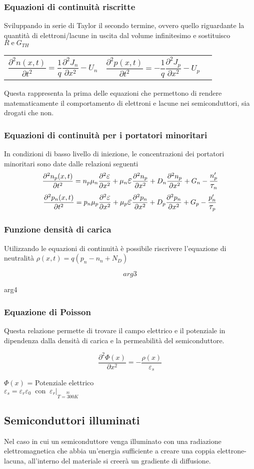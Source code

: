 \documentclass[12pt,a4paper]{article}
\makeatletter
\newcommand{\pdv}[3]{\frac{\partial^{#2} #1}{\partial #3^{#2}}}
\newcommand{\barSi}{\Big\lvert_{ \overset{Si}{T=300K}}}
\newcommand{\Tau}{ \mathlarger{\mathlarger{ \tau }}}
\newcommand{\Beps}{ \mathlarger{\mathlarger{ \varepsilon }}}
\newcommand{\eqlist}[4]{ 
	\subsubsection*{#1}
	\parbox{19cm}{#2}
	
	\begin{equation}
	#3
	\end{equation}
	\noindent\parbox{19cm}{#4}}
\newcommand{\deqlist}[5]{
	\subsubsection*{#1}
	
	\parbox{19cm}{#2}
	
	\noindent\begin{tabularx}{\textwidth}{@{}XXX@{}}
	\begin{equation}
	#3
	\end{equation}  & 
	\begin{equation}
	#4
	\end{equation}
	
	\end{tabularx}
	
	\noindent\parbox{19cm}{#5}}
\makeatother
\begin{document}
		\deqlist{Equazioni di continuità riscritte}
		{Sviluppando in serie di Taylor il secondo termine, ovvero quello riguardante la quantità di elettroni/lacune in uscita dal volume infinitesimo e sostituisco $ R \; \text{e} \; G_{TH}$}
		{\pdv{n(x,t)}{2}{t} = \frac{1}{q} \pdv{J_{n}}{2}{x} - U_{n}}
		{\pdv{p(x,t)}{2}{t} = - \frac{1}{q} \pdv{J_{p}}{2}{x} - U_{p}}
		{Questa rappresenta la prima delle equazioni che permettono di rendere matematicamente il comportamento di elettroni e lacune nei semiconduttori, sia drogati che non.} 
		
		
		\subsubsection*{Equazioni di continuità per i portatori minoritari}
		{In condizioni di basso livello di iniezione, le concentrazioni dei portatori minoritari sono date dalle relazioni seguenti }
		\begin{equation}
		\pdv{n_{p}(x,t)}{2}{t} = n_{p} \mu_{n}  \pdv{\Beps}{2}{x} + \mu_{n} \Beps \pdv{n_{p}}{2}{x} + D_{n} \pdv{n_{p}}{2}{x} + G_{n} -\frac{n_{p}'}{\Tau_{n}}
		\end{equation}
		\begin{equation}
		\pdv{p_{n}(x,t)}{2}{t} = p_{n} \mu_{p}  \pdv{\Beps}{2}{x} + \mu_{p} \Beps \pdv{p_{n}}{2}{x} + D_{p} \pdv{p_{n}}{2}{x} + G_{p} -\frac{p_{n}'}{\Tau_{p}}
		\end{equation}
		
		
		
		
		\eqlist{Funzione densità di carica}
		{Utilizzando le equazioni di continuità è possibile riscrivere l'equazione di neutralità $ \rho (x,t) = q(p_{n}-n_{n}+N_{D}) $}
		{arg3}
		{arg4}
		
		
		\eqlist{Equazione di Poisson}
		{Questa relazione permette di trovare il campo elettrico e il potenziale in dipendenza dalla densità di carica e la permeabilità del semiconduttore.}
		{\pdv{\Phi(x)}{2}{x} = -\frac{\rho(x)}{\varepsilon_{s}}}
		{$\Phi(x)$ = Potenziale elettrico \\ $\varepsilon_{s}=\varepsilon_{r} \varepsilon_{0} \; \; \text{con} \;\; \varepsilon_{r} \barSi $ }
	
	
	\subsection{Semiconduttori illuminati}
		Nel caso in cui un semiconduttore venga illuminato con una radiazione elettromagnetica che abbia un'energia sufficiente a creare una coppia elettrone-lacuna, all'interno del materiale si creerà un gradiente di diffusione.
		
\end{document}
